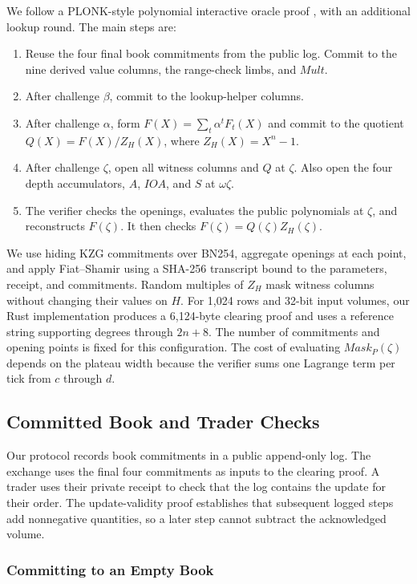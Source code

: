 We follow a PLONK-style polynomial interactive oracle proof \cite{GWC19}, with an additional lookup round. The main steps are:
\begin{enumerate}
\item Reuse the four final book commitments from the public log. Commit to the nine derived value columns, the range-check limbs, and \(Mult\).
\item After challenge \(\beta\), commit to the lookup-helper columns.
\item After challenge \(\alpha\), form \(F(X)=\sum_t\alpha^t F_t(X)\) and commit to the quotient \(Q(X)=F(X)/Z_H(X)\), where \(Z_H(X)=X^n-1\).
\item After challenge \(\zeta\), open all witness columns and \(Q\) at \(\zeta\). Also open the four depth accumulators, \(A\), \(IOA\), and \(S\) at \(\omega\zeta\).
\item The verifier checks the openings, evaluates the public polynomials at \(\zeta\), and reconstructs \(F(\zeta)\). It then checks \(F(\zeta)=Q(\zeta)Z_H(\zeta)\).
\end{enumerate}
We use hiding KZG commitments \cite{KZG10} over BN254, aggregate openings at each point, and apply Fiat--Shamir using a SHA-256 transcript bound to the parameters, receipt, and commitments. Random multiples of \(Z_H\) mask witness columns without changing their values on \(H\). For 1,024 rows and 32-bit input volumes, our Rust implementation produces a 6,124-byte clearing proof and uses a reference string supporting degrees through \(2n+8\). The number of commitments and opening points is fixed for this configuration. The cost of evaluating \(Mask_P(\zeta)\) depends on the plateau width because the verifier sums one Lagrange term per tick from \(c\) through \(d\).

\subsection{Committed Book and Trader Checks}
\label{app:committed-book}

Our protocol records book commitments in a public append-only log. The exchange uses the final four commitments as inputs to the clearing proof. A trader uses their private receipt to check that the log contains the update for their order. The update-validity proof establishes that subsequent logged steps add nonnegative quantities, so a later step cannot subtract the acknowledged volume.

\subsubsection{Committing to an Empty Book}

